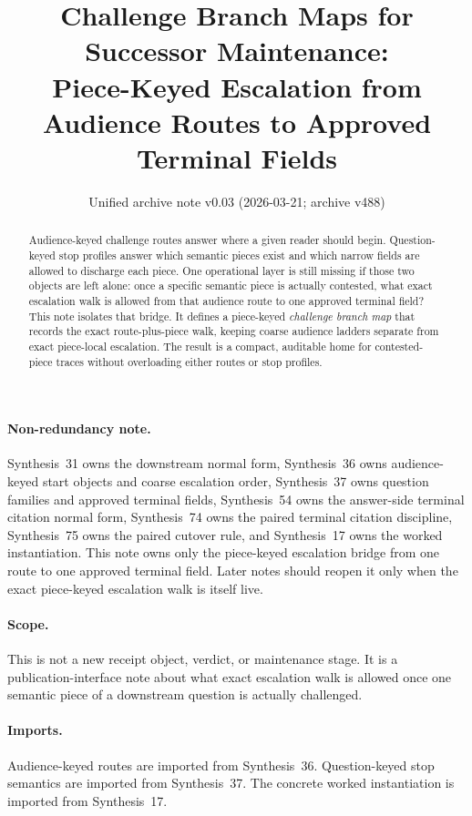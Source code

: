 \documentclass[11pt]{article}
\title{Challenge Branch Maps for Successor Maintenance:\\[0.5ex]
\large Piece-Keyed Escalation from Audience Routes to Approved Terminal Fields}
\author{}
\date{Unified archive note v0.03 (2026-03-21; archive v488)}
\begin{document}
\maketitle

\begin{abstract}
Audience-keyed challenge routes answer where a given reader should begin.
Question-keyed stop profiles answer which semantic pieces exist and which narrow fields are allowed to discharge each piece.
One operational layer is still missing if those two objects are left alone: once a specific semantic piece is actually contested, what exact escalation walk is allowed from that audience route to one approved terminal field?
This note isolates that bridge.
It defines a piece-keyed \emph{challenge branch map} that records the exact route-plus-piece walk, keeping coarse audience ladders separate from exact piece-local escalation.
The result is a compact, auditable home for contested-piece traces without overloading either routes or stop profiles.
\end{abstract}

\paragraph{Non-redundancy note.}
Synthesis~31 owns the downstream normal form, Synthesis~36 owns audience-keyed start objects and coarse escalation order, Synthesis~37 owns question families and approved terminal fields, Synthesis~54 owns the answer-side terminal citation normal form, Synthesis~74 owns the paired terminal citation discipline, Synthesis~75 owns the paired cutover rule, and Synthesis~17 owns the worked instantiation.
This note owns only the piece-keyed escalation bridge from one route to one approved terminal field. Later notes should reopen it only when the exact piece-keyed escalation walk is itself live.

\paragraph{Scope.}
This is not a new receipt object, verdict, or maintenance stage.
It is a publication-interface note about what exact escalation walk is allowed once one semantic piece of a downstream question is actually challenged.

\paragraph{Imports.}
Audience-keyed routes are imported from Synthesis~36.\cite{series:challengeroutes}
Question-keyed stop semantics are imported from Synthesis~37.\cite{series:challengestops}
The concrete worked instantiation is imported from Synthesis~17.\cite{series:workedexample}
\end{document}
